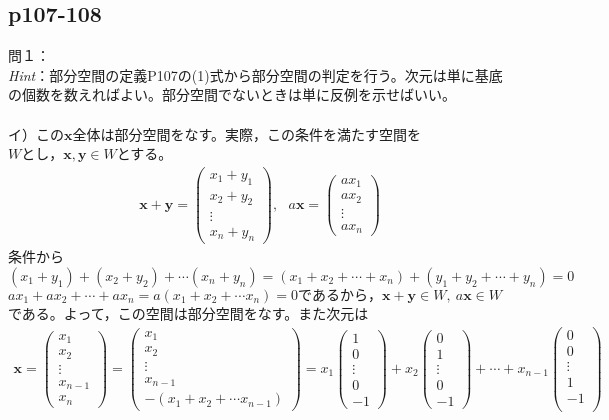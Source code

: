 \documentclass[dvipdfmx,uplatex,11pt]{jsarticle}
\begin{document}
\subsection{p107-108}
\noindent
問１：\\
\textsl{Hint}：部分空間の定義P107の(1)式から部分空間の判定を行う。次元は単に基底の個数を数えればよい。部分空間でないときは単に反例を示せばいい。\\
\dotfill \\
イ）この$\bm{x}全体は$部分空間をなす。実際，この条件を満たす空間を$Wとし，\bm{x,y} \in W$とする。
\begin{eqnarray*}
\bm{x}+\bm{y}=
\begin{pmatrix}
x_1+y_1 \\
x_2+y_2 \\
\vdots \\
x_n+y_n
\end{pmatrix}
,~~~
a\bm{x}=
\begin{pmatrix}
ax_1 \\
ax_2 \\
\vdots \\
ax_n
\end{pmatrix}
\end{eqnarray*}
条件から$(x_1+y_1)+(x_2+y_2)+\cdots (x_n+y_n)=(x_1+x_2+\cdots +x_n)+(y_1+y_2+\cdots +y_n)=0$\\
$ax_1+ax_2+ \cdots +ax_n=a(x_1+x_2+\cdots x_n)=0であるから，\bm{x}+\bm{y} \in W,~a\bm{x} \in W$である。よって，この空間は部分空間をなす。また次元は
\begin{eqnarray*}
\bm{x}=
\begin{pmatrix}
x_1 \\
x_2 \\
\vdots \\
x_{n-1} \\
x_n
\end{pmatrix}
=
\begin{pmatrix}
x_1 \\
x_2 \\
\vdots \\
x_{n-1} \\
-(x_1+x_2+\cdots x_{n-1})
\end{pmatrix}
=
x_1
\begin{pmatrix}
1 \\
0 \\
\vdots \\
0 \\
-1
\end{pmatrix}
+x_2
\begin{pmatrix}
0 \\
1 \\
\vdots \\
0 \\
-1
\end{pmatrix}
+\cdots +x_{n-1}
\begin{pmatrix}
0 \\
0 \\
\vdots \\
1 \\
-1\\
\end{pmatrix}
\end{eqnarray*}
\end{document}
